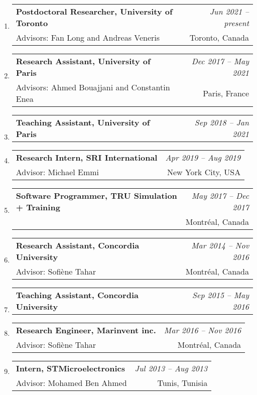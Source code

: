 \documentclass[10pt]{article}
\makeatletter
\newcommand{\lbar}[1]{{\color{#1}\ding{118}}\hspace*{2pt}}
\newenvironment{benumerate}[2]{
    \let\oldItem\item
    \def\item{\addtocounter{enumi}{-2}\oldItem}
    \begin{enumerate}[#2] \itemsep3pt
    \setcounter{enumi}{#1}
    \addtocounter{enumi}{1}}
  {\end{enumerate}}
\newcommand{\positionnodesc}[2]
{%
\item
  \begin{tabular*}{7.5in}{l@{\extracolsep{\fill}}r}
    \textbf{#1} & \textit{#2}
  \end{tabular*}
}
\newenvironment{position}[4]
{%
\item
  \begin{tabular*}{7.5in}{l@{\extracolsep{\fill}}r}
    \textbf{#1} & \textit{#2} \\
    \hspace{1ex} #3 & \small{#4} \\
  \end{tabular*}
  }
  { %
}
\newenvironment{region}[3]{%
  \vspace*{0.5ex}
  {\scalebox{1.4}{\textbf{#1}}}
  \begin{benumerate}{#3}{\color{RoyalBlue}#2}}
  {\end{benumerate}\vspace{0.8ex}}
\newenvironment{nonumregion}[1]{%
\begin{region}{#1}{}{1}}
{\end{region}}
\makeatother
\begin{document}
\begin{nonumregion} {\lbar{orange}Experience}
  \begin{position}{Postdoctoral Researcher, University of Toronto}{Jun 2021 -- present}
		{Advisors: Fan Long and Andreas Veneris}{Toronto, Canada}
  \end{position}
  \begin{position}{Research Assistant, University of Paris}{Dec 2017 -- May 2021}
		{Advisors: Ahmed Bouajjani and Constantin Enea}{Paris, France}
  \end{position}
  \positionnodesc{Teaching Assistant, University of Paris}{Sep 2018 -- Jan 2021}
  \begin{position}{Research Intern, SRI International}{Apr 2019 -- Aug 2019}
		{Advisor: Michael Emmi}{New York City, USA}
  \end{position}
  \begin{position}{Software Programmer, TRU Simulation + Training}{May 2017 -- Dec 2017}
      {}{Montr\'{e}al, Canada}
  \end{position}
  \begin{position}{Research Assistant, Concordia University}{Mar 2014 -- Nov 2016}
		{Advisor: Sofi\`{e}ne Tahar}{Montr\'{e}al, Canada}
  \end{position}
  \positionnodesc{Teaching Assistant, Concordia University}{Sep 2015 -- May 2016}
  \begin{position}{Research Engineer, Marinvent inc.}{Mar 2016 -- Nov 2016}
		{Advisor: Sofi\`{e}ne Tahar}{Montr\'{e}al, Canada}
  \end{position}
  
  \begin{position}{Intern, STMicroelectronics}{Jul 2013 -- Aug 2013}
    {Advisor: Mohamed Ben Ahmed}{Tunis, Tunisia}
  \end{position}


\end{nonumregion}
\end{document}
